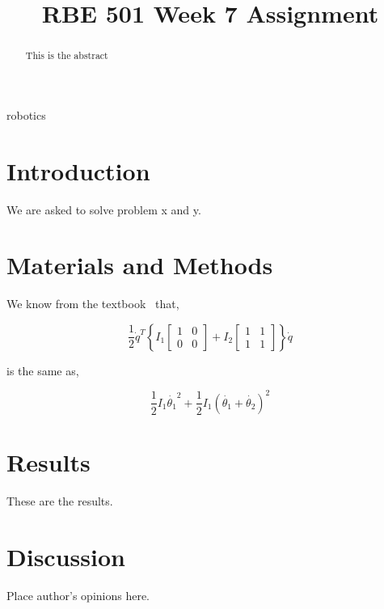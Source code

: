 \documentclass[conference]{IEEEtran}
\begin{document}
\title{RBE 501 Week 7 Assignment}

\author{
}

\maketitle

\begin{abstract}
This is the abstract
\end{abstract}

\begin{IEEEkeywords}
robotics
\end{IEEEkeywords}

\section{Introduction}
We are asked to solve problem x and y.

\section{Materials and Methods}

We know from the textbook~\cite{Spong2006} that,

\[
    \frac{1}{2} \dot{q}^T \left\{ I_1\begin{bmatrix}
        1 & 0\\
        0 & 0
    \end{bmatrix} +
    I_2\begin{bmatrix}
        1 & 1\\
        1 & 1
    \end{bmatrix}\right\}\dot{q}
\]

is the same as,

\[
    \frac{1}{2}I_1\dot{\theta_1}^2 + \frac{1}{2}I_1(\dot{\theta_1} + \dot{\theta_2})^2
\]

\section{Results}
These are the results.

\section{Discussion}

Place author's opinions here.


\end{document}
